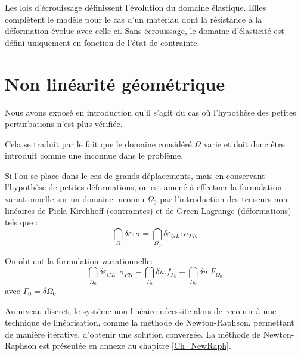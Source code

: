 Les lois d'écrouissage définissent l'évolution du domaine élastique.
Elles complètent le modèle pour le cas d'un matériau dont la résistance à la 
déformation évolue avec celle-ci.
Sans écrouissage, le domaine d'élasticité est défini uniquement en fonction de 
l'état de contrainte.










\medskip
\section{Non linéarité géométrique}\label{Sec-NLg}

Nous avons exposé en introduction qu'il s'agit du cas où l'hypothèse des petites perturbations
n'est plus vérifiée.

Cela se traduit par le fait que le domaine considéré $\Omega$ varie et doit donc être introduit comme
une inconnue dans le problème.

Si l'on se place dans le cas de grands déplacements, mais en conservant l'hypothèse de petites
déformations, on est amené à effectuer la formulation variationnelle sur un domaine inconnu
$\Omega_0$ par l'introduction des tenseurs non linéaires de Piola-Kirchhoff 
(contraintes) et de Green-Lagrange 
(déformations) tels que :
\begin{equation}
\dint_\Omega \delta\varepsilon:\sigma = \dint_{\Omega_0} \delta\varepsilon_{GL}:\sigma_{PK}
\end{equation}

On obtient la formulation variationnelle:
\begin{equation}
\dint_{\Omega_0}\delta\varepsilon_{GL}:\sigma_{PK} -\dint_{\Gamma_0} \delta u.f_{\Gamma_0}
-\dint_{\Omega_0} \delta u.F_{\Omega_0}
\end{equation}
avec $\Gamma_0=\delta\Omega_0$

\medskip
Au niveau discret, le système non linéaire nécessite alors de recourir à une technique de linéarisation, 
comme la méthode de Newton-Raphson, permettant de manière itérative, d'obtenir une solution convergée.
La méthode de 
Newton-Raphson 
est présentée en annexe au chapitre \ref{Ch_NewRaph}.












